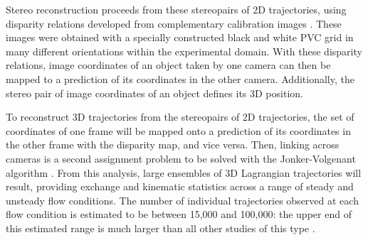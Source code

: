 Stereo reconstruction proceeds from these stereopairs of 2D trajectories, using disparity relations developed from complementary calibration images \citep{Wohler2009}. These images were obtained with a specially constructed black and white PVC grid in many different orientations within the experimental domain. With these disparity relations, image coordinates of an object taken by one camera can then be mapped to a prediction of its coordinates in the other camera. Additionally, the stereo pair of image coordinates of an object defines its 3D position. 
\bigskip 

To reconstruct 3D trajectories from the stereopairs of 2D trajectories, the set of coordinates of one frame will be mapped onto a prediction of its coordinates in the other frame with the disparity map, and vice versa. Then, linking across cameras is a second assignment problem to be solved with the Jonker-Volgenant algorithm \citep{Jonker1987}. From this analysis, large ensembles of 3D Lagrangian trajectories will result, providing exchange and kinematic statistics across a range of steady and unsteady flow conditions. The number of individual trajectories observed at each flow condition is estimated to be between 15,000 and 100,000: the upper end of this estimated range is much larger than all other studies of this type \citep[e.g.][]{Roseberry2012, Heyman2016}. 
\bigskip 
